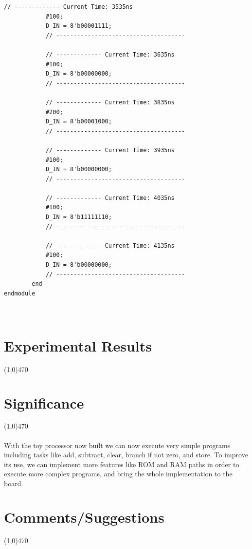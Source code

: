 \documentclass[12pt]{article}
\begin{document}
\begin{Verbatim}[frame=single, fontsize= \small]
			// ------------- Current Time: 3535ns 
			#100;
			D_IN = 8'b00001111;
			// -------------------------------------
			
			// ------------- Current Time: 3635ns 
			#100;
			D_IN = 8'b00000000;
			// -------------------------------------
			
			// ------------- Current Time: 3835ns 
			#200;
			D_IN = 8'b00001000;
			// -------------------------------------
			
			// ------------- Current Time: 3935ns 
			#100;
			D_IN = 8'b00000000;
			// -------------------------------------
			
			// ------------- Current Time: 4035ns 
			#100;
			D_IN = 8'b11111110;
			// -------------------------------------
			
			// ------------- Current Time: 4135ns 
			#100;
			D_IN = 8'b00000000;
			// -------------------------------------
		end 
endmodule

	
		\end{Verbatim}
		
			
\section{Experimental Results}\vspace{-.7cm} \line(1,0){470}

\begin{figure}[h]
    \centering
	\caption{}
\end{figure}

\begin{figure}[h]
    \centering
	\caption{}
\end{figure}

\begin{figure}[h]
    \centering
	\caption{}
\end{figure}

	\newpage
\section{Significance} \vspace{-.7cm} \line(1,0){470}
	\paragraph{} 
		With the toy processor now built we can now execute very simple programs including tasks like add, subtract, clear, branch if not zero, and store. To improve its use, we can implement more features like ROM and RAM paths in order to execute more complex programs, and bring the whole implementation to the board. 

 \section{Comments/Suggestions}\vspace{-.7cm} \line(1,0){470}
 	\paragraph{} 
		
\end{document}
